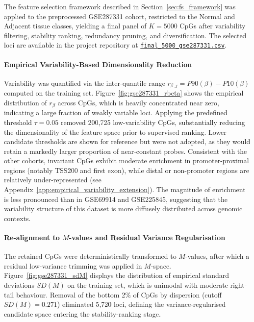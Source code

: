 The feature selection framework described in Section~\ref{sec:fs_framework} 
was applied to the preprocessed GSE287331 cohort, restricted to the 
Normal and Adjacent tissue classes, yielding a final panel of 
$K=5000$ CpGs after variability filtering, stability ranking, 
redundancy pruning, and diversification. The selected loci are 
available in the project repository at 
\href{https://github.com/elisabettaroviera/THESIS/blob/main/05%20-%20CpG%20list/Final%205000%20CpGs%20per%20Dataset/final_5000_gse287331.csv}
{\texttt{final\_5000\_gse287331.csv}}.

\paragraph{Empirical Variability-Based Dimensionality Reduction}

Variability was quantified via the inter-quantile range 
$r_{\beta,j} = P90(\beta) - P10(\beta)$ computed on the 
training set. Figure~\ref{fig:gse287331_rbeta} 
shows the empirical distribution of $r_{\beta}$ across CpGs, 
which is heavily concentrated near zero, indicating a large 
fraction of weakly variable loci.
Applying the predefined threshold $\tau = 0.05$ removed 
200{,}725 low-variability CpGs, substantially reducing the 
dimensionality of the feature space prior to supervised ranking. 
Lower candidate thresholds are shown for reference 
but were not adopted, as they would retain a markedly larger 
proportion of near-constant probes. Consistent with the other cohorts, invariant CpGs exhibit 
moderate enrichment in promoter-proximal regions (notably TSS200 
and first exon), while distal or non-promoter regions are 
relatively under-represented (see Appendix~\ref{app:empirical_variability_extension}). 
The magnitude of enrichment is less pronounced than in 
GSE69914 and GSE225845, suggesting that the variability structure 
of this dataset is more diffusely distributed across genomic 
contexts.


\paragraph{Re-alignment to $M$-values and Residual Variance Regularisation}

The retained CpGs were deterministically transformed to 
$M$-values, after which a residual low-variance trimming 
was applied in $M$-space. 
Figure~\ref{fig:gse287331_sdM} displays the distribution of 
empirical standard deviations $SD(M)$ on the training set, 
which is unimodal with moderate right-tail behaviour.
Removal of the bottom 2\% of CpGs by dispersion 
(cutoff $SD(M)=0.271$) eliminated 5{,}720 loci, 
defining the variance-regularised candidate space entering 
the stability-ranking stage.

